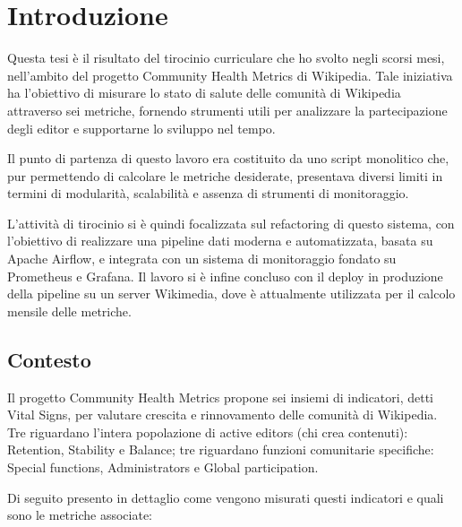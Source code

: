 \chapter{Introduzione}
\label{cha:intro}


Questa tesi è il risultato del tirocinio curriculare che ho svolto negli scorsi mesi, nell'ambito del progetto Community Health Metrics di Wikipedia.
Tale iniziativa ha l’obiettivo di misurare lo stato di salute delle comunità di Wikipedia attraverso sei metriche,
fornendo strumenti utili per analizzare la partecipazione degli editor e supportarne lo sviluppo nel tempo.

Il punto di partenza di questo lavoro era costituito da uno script monolitico che,
pur permettendo di calcolare le metriche desiderate, presentava diversi limiti in termini di modularità,
scalabilità e assenza di strumenti di monitoraggio.

L’attività di tirocinio si è quindi focalizzata sul refactoring di questo sistema,
con l’obiettivo di realizzare una pipeline dati moderna e automatizzata, basata su Apache Airflow, e integrata con un sistema di monitoraggio fondato su Prometheus e Grafana.
Il lavoro si è infine concluso con il deploy in produzione della pipeline su un server Wikimedia,
dove è attualmente utilizzata per il calcolo mensile delle metriche.

\section{Contesto}
\label{sec:contesto}
Il progetto Community Health Metrics propone sei insiemi di indicatori, detti Vital Signs, per valutare crescita e rinnovamento delle comunità di Wikipedia.
Tre riguardano l’intera popolazione di active editors (chi crea contenuti):
Retention, Stability e Balance;
tre riguardano funzioni comunitarie specifiche: Special functions, Administrators e Global participation.

Di seguito presento in dettaglio come vengono misurati questi indicatori e quali sono le metriche associate:

